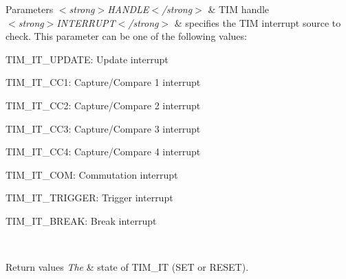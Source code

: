 \begin{DoxyParams}{Parameters}
{\em $<$strong$>$\+H\+A\+N\+D\+L\+E$<$/strong$>$} & T\+IM handle \\
\hline
{\em $<$strong$>$\+I\+N\+T\+E\+R\+R\+U\+P\+T$<$/strong$>$} & specifies the T\+IM interrupt source to check. This parameter can be one of the following values\+: \begin{DoxyItemize}
\item T\+I\+M\+\_\+\+I\+T\+\_\+\+U\+P\+D\+A\+TE\+: Update interrupt \item T\+I\+M\+\_\+\+I\+T\+\_\+\+C\+C1\+: Capture/\+Compare 1 interrupt \item T\+I\+M\+\_\+\+I\+T\+\_\+\+C\+C2\+: Capture/\+Compare 2 interrupt \item T\+I\+M\+\_\+\+I\+T\+\_\+\+C\+C3\+: Capture/\+Compare 3 interrupt \item T\+I\+M\+\_\+\+I\+T\+\_\+\+C\+C4\+: Capture/\+Compare 4 interrupt \item T\+I\+M\+\_\+\+I\+T\+\_\+\+C\+OM\+: Commutation interrupt \item T\+I\+M\+\_\+\+I\+T\+\_\+\+T\+R\+I\+G\+G\+ER\+: Trigger interrupt \item T\+I\+M\+\_\+\+I\+T\+\_\+\+B\+R\+E\+AK\+: Break interrupt \end{DoxyItemize}
\\
\hline
\end{DoxyParams}

\begin{DoxyRetVals}{Return values}
{\em The} & state of T\+I\+M\+\_\+\+IT (S\+ET or R\+E\+S\+ET). \\
\hline
\end{DoxyRetVals}
\mbox{\label{group___t_i_m___exported___macros_gac73f5e7669d92971830481e7298e98ba}} 

